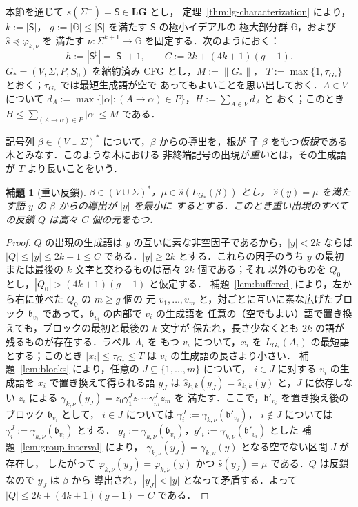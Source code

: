 \documentclass[11pt,a4paper]{ltjsarticle}
\numberwithin{equation}{section}
\theoremstyle{plain}
\newtheorem{lemma}[theorem]{補題}
\theoremstyle{definition}
\theoremstyle{remark}
\theoremstyle{plain}
\newcommand{\LG}{\mathbf{LG}}
\begin{document}
本節を通じて $s(\Sigma^+)=\mathsf S\in\LG$ とし，
定理~\ref{thm:lg-characterization} により，$k:=|\mathsf S|$，
$g:=|\mathbb G|\le|\mathsf S|$ を満たす $\mathsf S$ の極小イデアルの
極大部分群 $\mathbb G$，および $\widehat s\preceq\varphi_{k,\nu}$ を
満たす $\nu:\Sigma^{k+1}\to\mathbb G$ を固定する．次のようにおく：
\[
 h:=|\mathsf S^\sharp|=|\mathsf S|+1,\qquad C:=2k+(4k+1)(g-1).
\]
$G_*=(V,\Sigma,P,S_0)$ を縮約済み CFG とし，$M:=\|G_*\|$，
$T:=\max\{1,\tau_{G_*}\}$ とおく；$\tau_{G_*}$ では最短生成語が空で
あってもよいことを思い出しておく．$A\in V$ について
$d_A:=\max\{|\alpha|:(A\to\alpha)\in P\}$，$H:=\sum_{A\in V}d_A$ と
おく；このとき $H\le\sum_{(A\to\alpha)\in P}|\alpha|\le M$ である．

記号列 $\beta\in(V\cup\Sigma)^*$ について，$\beta$ からの導出を，根が
子 $\beta$ をもつ\emph{仮根}である木とみなす．このような木における
非終端記号の出現が\emph{重い}とは，その生成語が $T$ より長いことをいう．

\begin{lemma}[重い反鎖]
\label{lem:heavy}
$\beta\in(V\cup\Sigma)^*$，$\mu\in\widehat s(L_{G_*}(\beta))$ とし，
$\widehat s(y)=\mu$ を満たす語 $y$ の $\beta$ からの導出が $|y|$ を最小に
するとする．このとき重い出現のすべての反鎖 $Q$ は高々 $C$ 個の元をもつ．
\end{lemma}

\begin{proof}
$Q$ の出現の生成語は $y$ の互いに素な非空因子であるから，$|y|<2k$ ならば
$|Q|\le|y|\le2k-1\le C$ である．$|y|\ge2k$ とする．これらの因子のうち
$y$ の最初または最後の $k$ 文字と交わるものは高々 $2k$ 個である；それ
以外のものを $Q_0$ とし，$|Q_0|>(4k+1)(g-1)$ と仮定する．
補題~\ref{lem:buffered} により，左から右に並べた $Q_0$ の $m\ge g$ 個の
元 $v_1,\ldots,v_m$ と，対ごとに互いに素な広げたブロック
$\mathfrak b_{v_i}$ であって，$\mathfrak b_{v_i}$ の内部で $v_i$ の生成語を
任意の（空でもよい）語で置き換えても，ブロックの最初と最後の $k$ 文字が
保たれ，長さ少なくとも $2k$ の語が残るものが存在する．ラベル $A_i$ を
もつ $v_i$ について，$x_i$ を $L_{G_*}(A_i)$ の最短語とする；このとき
$|x_i|\le\tau_{G_*}\le T$ は $v_i$ の生成語の長さより小さい．
補題~\ref{lem:blocks} により，任意の $J\subseteq\{1,\ldots,m\}$ について，
$i\in J$ に対する $v_i$ の生成語を $x_i$ で置き換えて得られる語 $y_J$ は
$\widehat s_{k,k}(y_J)=\widehat s_{k,k}(y)$ と，$J$ に依存しない $z_i$
による $\gamma_{k,\nu}(y_J)=z_0\gamma^J_1z_1\cdots\gamma^J_mz_m$ を
満たす．ここで，$\mathfrak b'_{v_i}$ を置き換え後のブロック $\mathfrak b_{v_i}$ として，
$i\in J$ については $\gamma^J_i:=\gamma_{k,\nu}(\mathfrak b'_{v_i})$，
$i\notin J$ については $\gamma^J_i:=\gamma_{k,\nu}(\mathfrak b_{v_i})$ とする．
$g_i:=\gamma_{k,\nu}(\mathfrak b_{v_i})$，$g'_i:=\gamma_{k,\nu}(\mathfrak b'_{v_i})$ とした
補題~\ref{lem:group-interval} により，
$\gamma_{k,\nu}(y_J)=\gamma_{k,\nu}(y)$ となる空でない区間 $J$ が存在し，
したがって $\varphi_{k,\nu}(y_J)=\varphi_{k,\nu}(y)$ かつ
$\widehat s(y_J)=\mu$ である．$Q$ は反鎖なので $y_J$ は $\beta$ から
導出され，$|y_J|<|y|$ となって矛盾する．よって
$|Q|\le2k+(4k+1)(g-1)=C$ である．
\end{proof}
\end{document}
